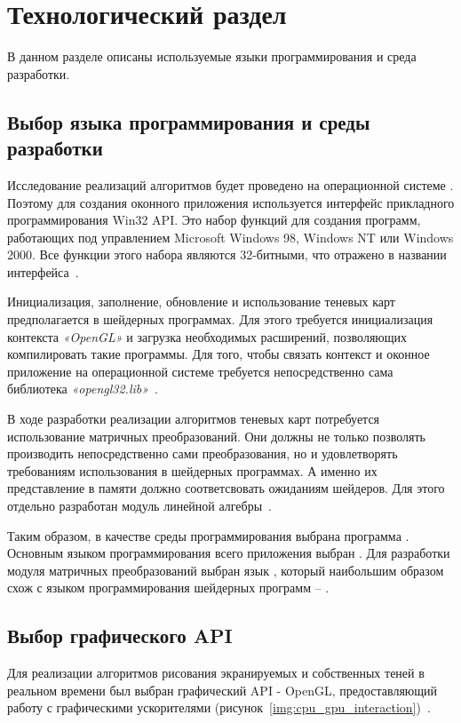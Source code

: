 \chapter{Технологический раздел}

В данном разделе описаны используемые языки программирования и среда
разработки.

\section{Выбор языка программирования и среды разработки}

Исследование реализаций алгоритмов будет проведено на операционной системе
. Поэтому для создания оконного приложения используется
интерфейс прикладного программирования Win32 API. Это набор функций
для создания программ, работающих под управлением Microsoft Windows 98,
Windows NT или Windows 2000. Все функции этого набора являются 32-битными,
что отражено в названии интерфейса~\cite{Win32Api_Shupak}.

Инициализация, заполнение, обновление и использование теневых карт
предполагается в шейдерных программах. Для этого требуется инициализация
контекста \textit{«OpenGL»} и загрузка необходимых расширений, 
позволяющих компилировать такие программы. Для того,
чтобы связать контекст и оконное приложение на операционной системе
 требуется непосредственно сама библиотека
\textit{«opengl32.lib»}~\cite{extOpenGL}.

В ходе разработки реализации алгоритмов теневых карт потребуется
использование матричных преобразований. Они должны не только позволять
производить непосредственно сами преобразования, но и удовлетворять
требованиям использования в шейдерных программах. А именно их представление
в памяти должно соответсвовать ожиданиям шейдеров. Для этого отдельно
разработан модуль линейной алгебры~\cite{Linal}.

Таким образом, в качестве среды программирования выбрана программа
. Основным языком программирования всего приложения
выбран . Для разработки модуля матричных преобразований выбран язык
, который наибольшим образом схож с языком программирования шейдерных
программ -- .

\section{Выбор графического API}

Для реализации алгоритмов рисования экранируемых и собственных теней в реальном времени
был выбран графический API - OpenGL, предоставляющий работу с графическими
ускорителями (\hbox{рисунок~\ref{img:cpu_gpu_interaction}})~\cite{extOpenGL}.

